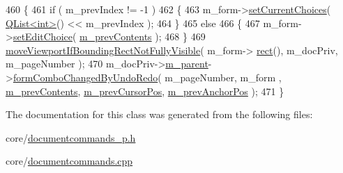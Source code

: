 \begin{DoxyCode}
460 \{
461     \textcolor{keywordflow}{if} ( m\_prevIndex != -1 )
462     \{
463         m\_form->\hyperlink{classOkular_1_1FormFieldChoice_a04709d9348dffe9de80178b9be2f2521}{setCurrentChoices}( \hyperlink{classQList}{QList<int>}() << m\_prevIndex );
464     \}
465     \textcolor{keywordflow}{else}
466     \{
467         m\_form->\hyperlink{classOkular_1_1FormFieldChoice_a4d1604d12cc73427f22e923b250532c6}{setEditChoice}( \hyperlink{classOkular_1_1EditTextCommand_a461d065fa44222a7c94a23ce2df39188}{m\_prevContents} );
468     \}
469     \hyperlink{namespaceOkular_a1e0f22fec5a200bd3b1835b7bfd95172}{moveViewportIfBoundingRectNotFullyVisible}( m\_form->
      \hyperlink{classOkular_1_1FormField_a76014a9315921056764c72dd17b81339}{rect}(), m\_docPriv, m\_pageNumber );
470     m\_docPriv->\hyperlink{classOkular_1_1DocumentPrivate_ac921eda41c014869ffec96ecc569c713}{m\_parent}->\hyperlink{classOkular_1_1Document_ada246b3ac5212e3911dc339b75da13da}{formComboChangedByUndoRedo}( m\_pageNumber, m\_form
      , \hyperlink{classOkular_1_1EditTextCommand_a461d065fa44222a7c94a23ce2df39188}{m\_prevContents}, \hyperlink{classOkular_1_1EditTextCommand_a5bc4e5af11ce42281c590750e0c75b51}{m\_prevCursorPos}, \hyperlink{classOkular_1_1EditTextCommand_afe5d2bc5003ae94ec364eeabd5789e64}{m\_prevAnchorPos} );
471 \}
\end{DoxyCode}


The documentation for this class was generated from the following files\+:\begin{DoxyCompactItemize}
\item 
core/\hyperlink{documentcommands__p_8h}{documentcommands\+\_\+p.\+h}\item 
core/\hyperlink{documentcommands_8cpp}{documentcommands.\+cpp}\end{DoxyCompactItemize}

